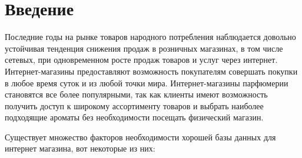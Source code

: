 \chapter*{Введение}
 
Последние годы на рынке товаров народного потребления наблюдается довольно устойчивая тенденция снижения продаж в розничных магазинах, в том числе сетевых, при одновременном росте продаж товаров и услуг через интернет. Интернет-магазины предоставляют возможность покупателям совершать покупки в любое время суток и из любой точки мира. Интернет-магазины парфюмерии становятся все более популярными, так как клиенты имеют возможность получить доступ к широкому ассортименту товаров и выбрать наиболее подходящие ароматы без необходимости посещать физический магазин. 

Существует множество факторов необходимости хорошей базы данных для интернет магазина, вот некоторые из них:


